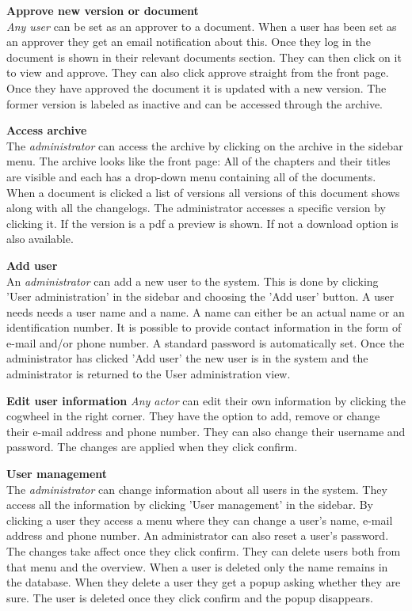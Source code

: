 \textbf{Approve new version or document}
\\
\textit{Any user} can be set as an approver to a document.
When a user has been set as an approver they get an email notification about this.
Once they log in the document is shown in their relevant documents section.
They can then click on it to view and approve.
They can also click approve straight from the front page.
Once they have approved the document it is updated with a new version.
The former version is labeled as inactive and can be accessed through the archive.

\textbf{Access archive}
\\
The \textit{administrator} can access the archive by clicking on the archive in the sidebar menu.
The archive looks like the front page:
All of the chapters and their titles are visible and each has a drop-down menu containing all of the documents.
When a document is clicked a list of versions all versions of this document shows along with all the changelogs.
The administrator accesses a specific version by clicking it.
If the version is a pdf a preview is shown.
If not a download option is also available.

\textbf{Add user}
\\
An \textit{administrator} can add a new user to the system.
This is done by clicking 'User administration' in the sidebar and choosing the 'Add user' button.
A user needs needs a user name and a name.
A name can either be an actual name or an identification number.
It is possible to provide contact information in the form of e-mail and/or phone number.
A standard password is automatically set.
Once the administrator has clicked 'Add user' the new user is in the system and the administrator is returned to the User administration view.

\textbf{Edit user information}
\textit{Any actor} can edit their own information by clicking the cogwheel in the right corner.
They have the option to add, remove or change their e-mail address and phone number.
They can also change their username and password.
The changes are applied when they click confirm.

\textbf{User management}
\\
The \textit{administrator} can change information about all users in the system.
They access all the information by clicking 'User management' in the sidebar.
By clicking a user they access a menu where they can change a user's name, e-mail address and phone number.
An administrator can also reset a user's password.
The changes take affect once they click confirm.
They can delete users both from that menu and the overview.
When a user is deleted only the name remains in the database.
When they delete a user they get a popup asking whether they are sure.
The user is deleted once they click confirm and the popup disappears.

